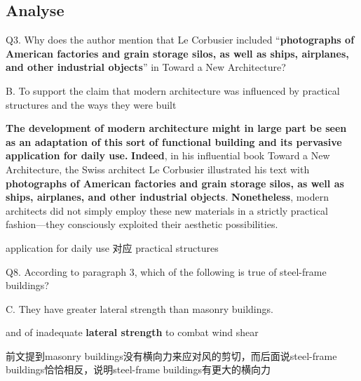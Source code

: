 \newpage

\subsection{Analyse}

\begin{blk}
    \begin{qst}
        Q3. Why does the author mention that Le Corbusier included “\textbf{photographs of American factories and grain storage silos, as well as ships, airplanes, and other industrial objects}” in Toward a New Architecture?
    \end{qst}

    \begin{chc}
        B. To support the claim that modern architecture was influenced by practical structures and the ways they were built
    \end{chc}

    \begin{psgq}
        \textbf{The development of modern architecture might in large part be seen as an adaptation of this sort of functional building and its pervasive application for daily use.} \textbf{Indeed}, in his influential book Toward a New Architecture, the Swiss architect Le Corbusier illustrated his text with \textbf{photographs of American factories and grain storage silos, as well as ships, airplanes, and other industrial objects}. \textbf{Nonetheless}, modern architects did not simply employ these new materials in a strictly practical fashion—they consciously exploited their aesthetic possibilities.
    \end{psgq}

    \begin{nlz}
        application for daily use 对应 practical structures
    \end{nlz}
\end{blk}

\begin{blk}
    \begin{qst}
        Q8. According to paragraph 3, which of the following is true of steel-frame buildings?
    \end{qst}

    \begin{chc}
        C. They have greater lateral strength than masonry buildings.
    \end{chc}

    \begin{psgq}
        and of inadequate \textbf{lateral strength} to combat wind shear
    \end{psgq}

    \begin{nlz}
        前文提到masonry buildings没有横向力来应对风的剪切，而后面说steel-frame buildings恰恰相反，说明steel-frame buildings有更大的横向力
    \end{nlz}
\end{blk}

